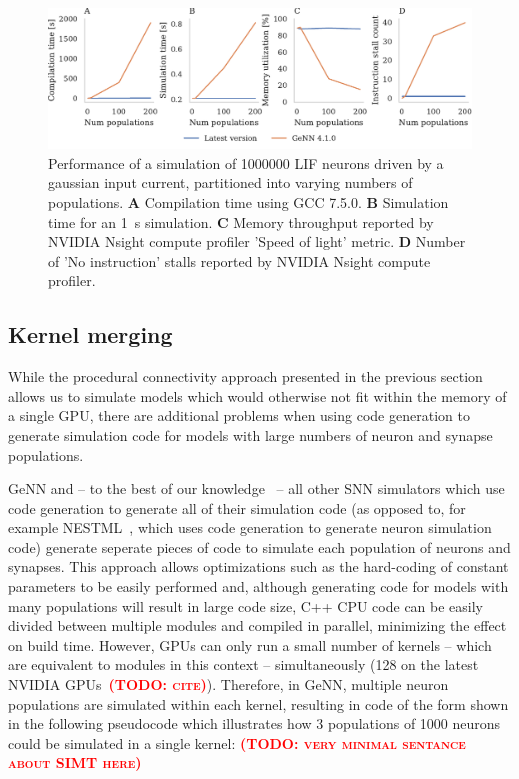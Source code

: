 \documentclass[9pt,twocolumn,twoside,lineno]{pnas-new}
\newcommand{\todo}[1]{\textbf{\textsc{\textcolor{red}{(TODO: #1)}}}}
\begin{document}
\begin{figure}
    \centering
    \includegraphics{figures/merging_scaling}
    \caption{Performance of a simulation of \num{1000000} LIF neurons driven by a gaussian input current, partitioned into varying numbers of populations. 
    \textbf{A} Compilation time using GCC 7.5.0.
    \textbf{B} Simulation time for an \SI{1}{\second} simulation.
    \textbf{C} Memory throughput reported by NVIDIA Nsight compute profiler 'Speed of light' metric.
    \textbf{D} Number of 'No instruction' stalls reported by NVIDIA Nsight compute profiler.}
    \label{fig:merging_scaling}
\end{figure}

\subsection*{Kernel merging}
While the procedural connectivity approach presented in the previous section allows us to simulate models which would otherwise not fit within the memory of a single GPU, there are additional problems when using code generation to generate simulation code for models with large numbers of neuron and synapse populations.

GeNN and -- to the best of our knowledge~\citep{Blundell2018} -- all other SNN simulators which use code generation to generate all of their simulation code (as opposed to, for example NESTML~\citep{Plotnikov2016}, which uses code generation to generate neuron simulation code) generate seperate pieces of code to simulate each population of neurons and synapses.
This approach allows optimizations such as the hard-coding of constant parameters to be easily performed and, although generating code for models with many populations will result in large code size, C++ CPU code  can be easily divided between multiple modules and compiled in parallel, minimizing the effect on build time.
However, GPUs can only run a small number of kernels -- which are equivalent to modules in this context --  simultaneously (128 on the latest NVIDIA GPUs~\todo{cite}).
Therefore, in GeNN, multiple neuron populations are simulated within each kernel, resulting in code of the form shown in the following pseudocode which illustrates how 3 populations of 1000 neurons could be simulated in a single kernel:
\todo{very minimal sentance about SIMT here}
\end{document}
